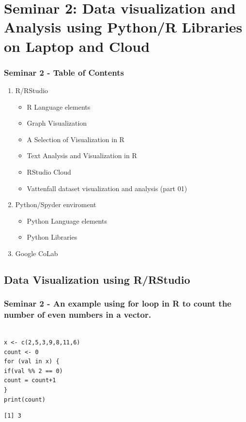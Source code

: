 \documentclass{beamer}
\begin{document}
\section{Seminar 2: Data visualization and Analysis using
Python/R Libraries on Laptop and Cloud}
\begin{frame}[fragile] %
\frametitle{Seminar 2 - Table of Contents}

\begin{enumerate}
\item R/RStudio
\begin{itemize}
\item R Language elements
\item Graph Visualization 
\item A Selection of Visualization in R
\item Text Analysis and Visualization in R
\item RStudio Cloud
\item Vattenfall dataset visualization and analysis (part 01)
\end{itemize}

\item Python/Spyder enviroment
\begin{itemize}
\item Python Language elements
\item Python Libraries
\end{itemize}

\item Google CoLab

\end{enumerate}

\end{frame}
\subsection{Data Visualization using R/RStudio} 
\begin{frame}[fragile] %
\frametitle{Seminar 2 - An example using for loop in R to count the number of even numbers in a vector.}
\begin{example}[1.1]
\begin{verbatim}

x <- c(2,5,3,9,8,11,6)
count <- 0
for (val in x) {
if(val %% 2 == 0)
count = count+1
}
print(count)
\end{verbatim}
\end{example}
\begin{example}[1.1 output:]
\begin{verbatim}
[1] 3
\end{verbatim}
\end{example}
\end{frame}
\end{document}
